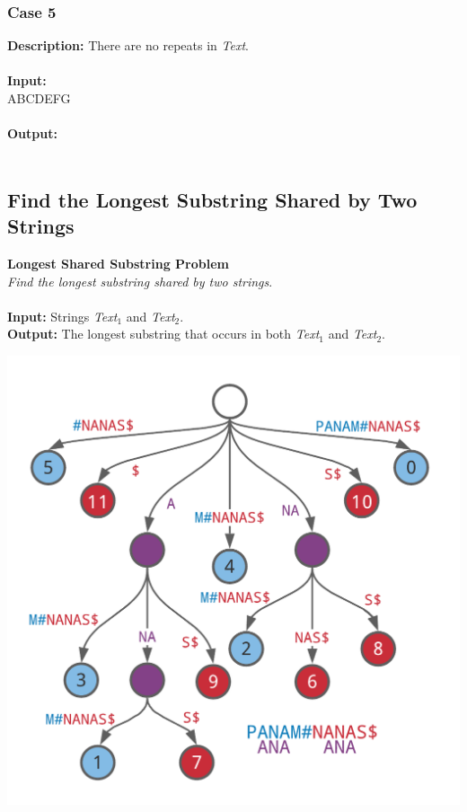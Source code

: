 \documentclass{article}
\newcommand{\code}[1]{{\fontfamily{pcr}\selectfont #1}}
\begin{document}
\subsubsection*{Case 5}
\hline \vspace{5}
\textbf{Description:} There are no repeats in \emph{Text}.\\ \\
\noindent \textbf{Input:} \\
\code{ABCDEFG}\\ \\
\noindent \textbf{Output:}\\
\\

\pagebreak
\subsection{Find the Longest Substring Shared by Two Strings}
\hline\vspace{5}
\textbf{Longest Shared Substring Problem}\\
\emph{Find the longest substring shared by two strings}.\\ \\
\textbf{Input:} Strings \emph{Text}$_1$ and \emph{Text}$_2$.\\
\textbf{Output:} The longest substring that occurs in both \emph{Text}$_1$ and \emph{Text}$_2$.
\begin{center}
    \includegraphics[scale=0.2]{logos/9E.png} 
\end{center}
\hline \vspace{5}
\end{document}
